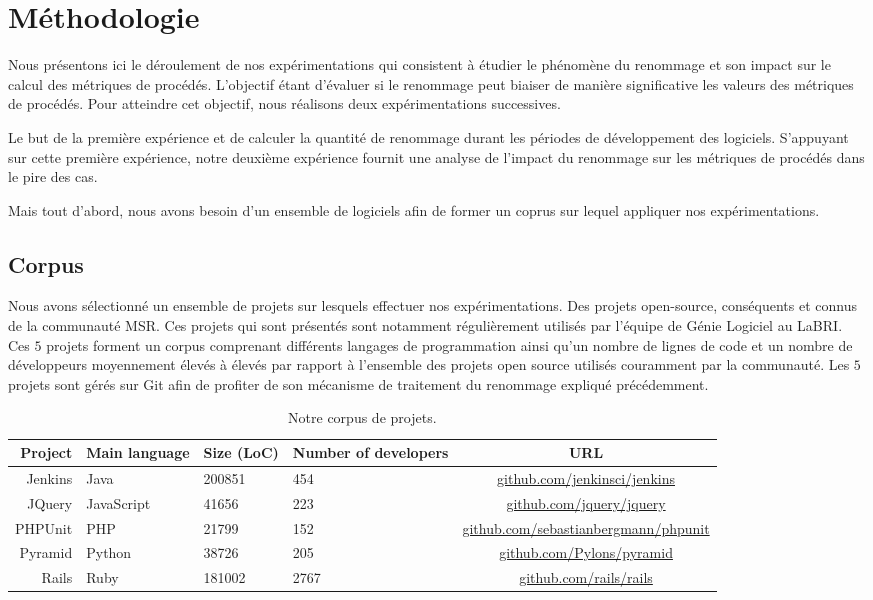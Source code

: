 \section{Méthodologie}
\label{sec:methodologie}

Nous présentons ici le déroulement de nos expérimentations qui consistent à étudier le phénomène du renommage et son impact sur le calcul des métriques de procédés. L’objectif étant d’évaluer si le renommage peut biaiser de manière significative les valeurs des métriques de procédés. Pour atteindre cet objectif, nous réalisons deux expérimentations successives.

Le but de la première expérience et de calculer la quantité de renommage durant les périodes de développement des logiciels. S’appuyant sur cette première expérience, notre deuxième expérience fournit une analyse de l’impact du renommage sur les métriques de procédés dans le pire des cas. 

Mais tout d'abord, nous avons besoin d'un ensemble de logiciels afin de former un coprus sur lequel appliquer nos expérimentations. 

\subsection{Corpus}

Nous avons sélectionné un ensemble de projets sur lesquels effectuer nos expérimentations. Des projets open-source, conséquents et connus de la communauté MSR. Ces projets qui sont présentés  sont notamment régulièrement utilisés par l'équipe de Génie Logiciel au LaBRI. Ces $5$ projets forment un corpus comprenant différents langages de programmation ainsi qu'un nombre de lignes de code et un nombre de développeurs moyennement élevés à élevés par rapport à l'ensemble des projets open source utilisés couramment par la communauté. Les $5$ projets sont gérés sur Git afin de profiter de son mécanisme de traitement du renommage expliqué précédemment. \\

\begin{table}[h]
\centering
\small
\begin{tabular}{rllp{1.7cm}c}
\toprule
Project & Main language & Size (LoC) & Number of developers & URL\\
\midrule
Jenkins & Java & 200851 & 454 & \url{github.com/jenkinsci/jenkins} \\
JQuery & JavaScript & 41656 & 223 & \url{github.com/jquery/jquery} \\
PHPUnit & PHP & 21799 & 152 & \url{github.com/sebastianbergmann/phpunit}\\
Pyramid & Python & 38726 & 205 & \url{github.com/Pylons/pyramid} \\
Rails & Ruby & 181002 & 2767 & \url{github.com/rails/rails}\\
\bottomrule
\end{tabular}
\caption{Notre corpus de projets.}
\label{tab:projects}
\end{table}

